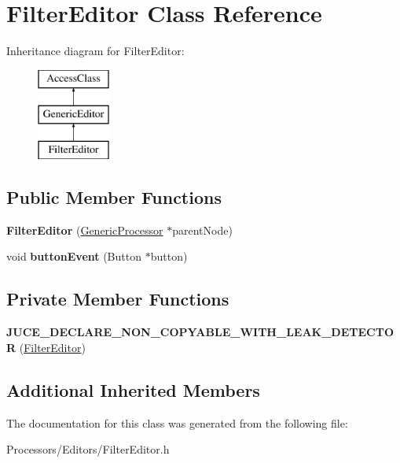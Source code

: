 \hypertarget{classFilterEditor}{\section{Filter\-Editor Class Reference}
\label{classFilterEditor}
}
Inheritance diagram for Filter\-Editor\-:\begin{figure}[H]
\begin{center}
\leavevmode
\includegraphics[height=3.000000cm]{classFilterEditor}
\end{center}
\end{figure}
\subsection*{Public Member Functions}
\begin{DoxyCompactItemize}
\item 
\hypertarget{classFilterEditor_a61c6bedbd0681fb649b4e1a302e05df7}{{\bfseries Filter\-Editor} (\hyperlink{classGenericProcessor}{Generic\-Processor} $\ast$parent\-Node)}\label{classFilterEditor_a61c6bedbd0681fb649b4e1a302e05df7}

\item 
\hypertarget{classFilterEditor_a79333a8d50202a3c9427a8e41d6457e9}{void {\bfseries button\-Event} (Button $\ast$button)}\label{classFilterEditor_a79333a8d50202a3c9427a8e41d6457e9}

\end{DoxyCompactItemize}
\subsection*{Private Member Functions}
\begin{DoxyCompactItemize}
\item 
\hypertarget{classFilterEditor_ad455b4ba047404a7d611429e26ea1a11}{{\bfseries J\-U\-C\-E\-\_\-\-D\-E\-C\-L\-A\-R\-E\-\_\-\-N\-O\-N\-\_\-\-C\-O\-P\-Y\-A\-B\-L\-E\-\_\-\-W\-I\-T\-H\-\_\-\-L\-E\-A\-K\-\_\-\-D\-E\-T\-E\-C\-T\-O\-R} (\hyperlink{classFilterEditor}{Filter\-Editor})}\label{classFilterEditor_ad455b4ba047404a7d611429e26ea1a11}

\end{DoxyCompactItemize}
\subsection*{Additional Inherited Members}


The documentation for this class was generated from the following file\-:\begin{DoxyCompactItemize}
\item 
Processors/\-Editors/Filter\-Editor.\-h\end{DoxyCompactItemize}
